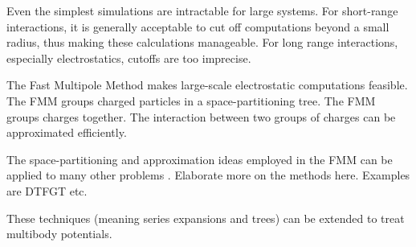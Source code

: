 \documentclass[twoside,leqno, 12pt]{article}
\begin{document}
Even the simplest simulations are intractable for large systems.  
For short-range interactions, it is generally acceptable to cut off computations beyond a small radius, thus making these calculations manageable.  For long range interactions, especially electrostatics, cutoffs are too imprecise.  

The Fast Multipole Method \cite{grngard} makes large-scale electrostatic computations feasible.  
The FMM groups charged particles in a space-partitioning tree.  
The FMM groups charges together.  The interaction between two groups of charges can be approximated efficiently.

The space-partitioning and approximation ideas employed in the FMM can be applied to many other problems \cite{gray_nbody}.  Elaborate more on the methods here.  Examples are DTFGT etc.


These techniques (meaning series expansions and trees) can be extended to treat multibody potentials.  












\end{document}
